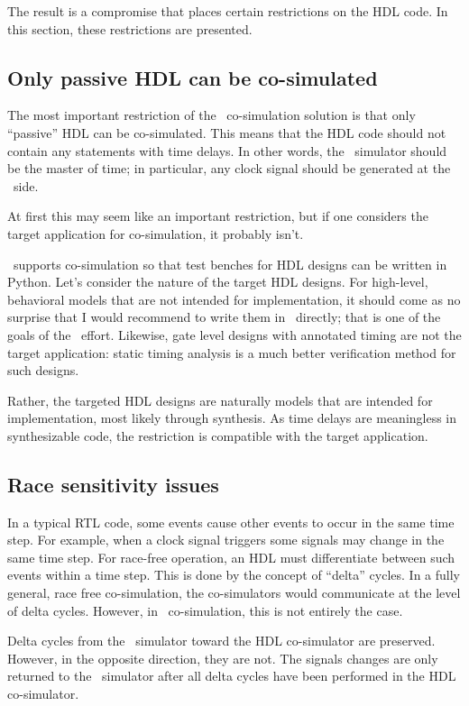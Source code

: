The result is a compromise that places certain restrictions
on the HDL code. In this section, these restrictions 
are presented.

\subsection{Only passive HDL can be co-simulated}

The most important restriction of the \myhdl\ co-simulation solution is
that only ``passive'' HDL can be co-simulated.  This means that the HDL
code should not contain any statements with time delays. In other
words, the \myhdl\ simulator should be the master of time; in
particular, any clock signal should be generated at the \myhdl\ side.

At first this may seem like an important restriction, but if one
considers the target application for co-simulation, it probably
isn't. 

\myhdl\ supports co-simulation so that test benches for HDL
designs can be written in Python.  Let's consider the nature of the
target HDL designs. For high-level, behavioral models that are not
intended for implementation, it should come as no surprise that I
would recommend to write them in \myhdl\ directly; that is one of the
goals of the \myhdl\ effort. Likewise, gate level designs with
annotated timing are not the target application: static timing
analysis is a much better verification method for such designs.

Rather, the targeted HDL designs are naturally models that are
intended for implementation, most likely through synthesis. As time
delays are meaningless in synthesizable code, the restriction is
compatible with the target application.

\subsection{Race sensitivity issues}

In a typical RTL code, some events cause other events to occur in the
same time step. For example, when a clock signal triggers some signals
may change in the same time step. For race-free operation, an HDL
must differentiate between such events within a time step. This is done
by the concept of ``delta'' cycles. In a fully general, race free
co-simulation, the co-simulators would communicate at the level of delta
cycles. However, in \myhdl\ co-simulation, this is not entirely the
case.

Delta cycles from the \myhdl\ simulator toward the HDL co-simulator are
preserved. However, in the opposite direction, they are not. The
signals changes are only returned to the \myhdl\ simulator after all delta
cycles have been performed in the HDL co-simulator.

